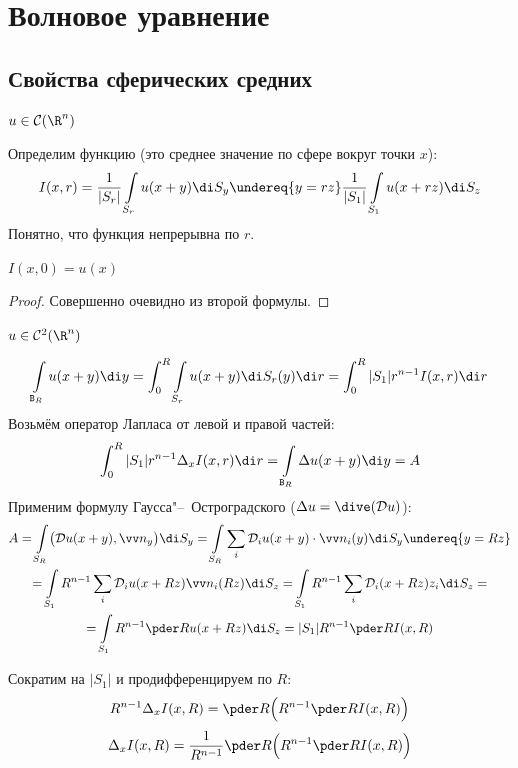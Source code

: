 \chapter{Волновое уравнение}

\section{Свойства сферических средних}

$ u \in \mathcal C(\R^n) $

Определим функцию (это среднее значение по сфере вокруг точки $ x $):
$$ I(x, r) = \frac1{|S_r|} \int\limits_{S_r} u(x + y) \di S_y \undereq{y = rz}
\frac1{|S_1|} \int\limits_{S_1} u(x + rz) \di S_z $$
Понятно, что функция непрерывна по $ r $.

\begin{statement}
	$ I(x, 0) = u(x) $
\end{statement}

\begin{proof}
	Совершенно очевидно из второй формулы.
\end{proof}

\begin{statement}
	$ u \in \mathcal C^2(\R^n) $

	$$ \int\limits_{\mathtt B_R} u(x + y) \di y =
	\int_0^R \int\limits_{S_r} u(x + y) \di S_r(y) \di r =
	\int_0^R |S_1| r^{n - 1} I(x, r) \di r $$
	Возьмём оператор Лапласа от левой и правой частей:
	$$ \int_0^R |S_1| r^{n - 1} \Delta_x I(x, r) \di r =
	\int\limits_{\mathtt B_R} \Delta u(x + y) \di y = A $$
	Применим формулу Гаусса"--~Остроградского ($ \Delta u = \dive (\mathcal D u) $):
	\begin{multline*}
		A = \int\limits_{S_R} \bigl( \mathcal D u(x + y), \vv n_y \bigr) \di S_y =
		\int\limits_{S_R} \sum_i \mathcal D_i u(x + y) \cdot \vv n_i(y) \di S_y
		\undereq{y = Rz} \\
		= \int\limits_{S_1} R^{n - 1} \sum_i \mathcal D_i u(x + Rz) \vv n_i(Rz) \di S_z =
		\int\limits_{S_1} R^{n - 1} \sum_i \mathcal D_i (x + Rz) z_i \di S_z = \\
		= \int\limits_{S_1} R^{n - 1} \pder R u(x + Rz) \di S_z = |S_1| R^{n - 1} \pder R  I(x, R)
	\end{multline*}

	Сократим на $ |S_1| $ и продифференцируем по $ R $:
	$$ R^{n - 1} \Delta_x I(x, R) = \pder R \Bigl( R^{n - 1} \pder R I(x, R) \Bigr) $$
	$$ \Delta_x I(x, R) = \frac1{R^{n - 1}} \pder R \Bigl( R^{n - 1} \pder R I(x, R) \Bigr) $$
\end{statement}

